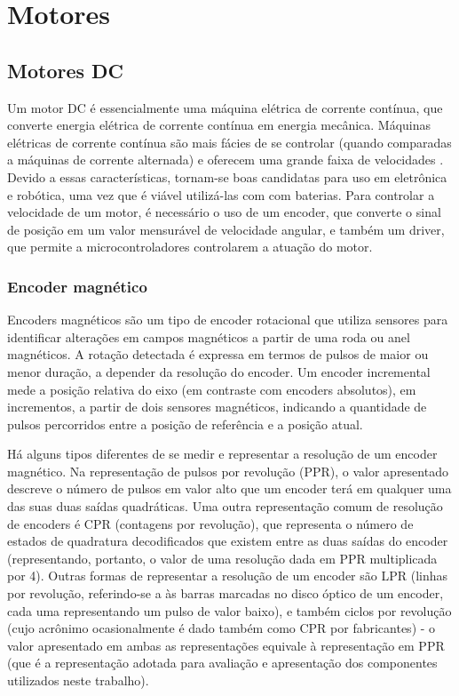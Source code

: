 
\section{Motores}  \label{secao_motores}

\subsection{Motores DC}


Um motor DC é essencialmente uma máquina elétrica de corrente contínua, que
converte energia elétrica de corrente contínua em energia mecânica. Máquinas
elétricas de corrente contínua são mais fácies de se controlar (quando
comparadas a máquinas de corrente alternada) e oferecem uma grande faixa de
velocidades \cite{Maquinas_eletricas}. Devido a essas características, tornam-se
boas candidatas para uso em eletrônica e robótica, uma vez que é viável
utilizá-las com com baterias. Para controlar a velocidade de um motor, é
necessário o uso de um encoder, que converte o sinal de posição em um valor
mensurável de velocidade angular, e também um driver, que permite a
microcontroladores controlarem a atuação do motor.

\subsubsection{Encoder magnético}

	Encoders magnéticos são um tipo de encoder rotacional que utiliza sensores 
	para identificar alterações em campos magnéticos a partir de uma roda ou 
	anel magnéticos. A rotação detectada é expressa em termos de pulsos de maior
	ou menor duração, a depender da resolução do encoder. Um encoder incremental
	mede a posição relativa do eixo (em contraste com encoders absolutos), em
	incrementos, a partir de dois sensores magnéticos, indicando a quantidade de
	pulsos percorridos entre a posição de referência e a posição atual.
	
	Há alguns tipos diferentes de se medir e representar a resolução de um
	encoder magnético. Na representação de pulsos por revolução (PPR), o valor 
	apresentado descreve o número de pulsos em valor alto que um encoder terá em
	qualquer uma das suas duas saídas quadráticas. Uma outra representação comum
	de resolução de encoders é CPR (contagens por revolução), que representa o
	número de estados de quadratura decodificados que existem entre as duas
	saídas do encoder (representando, portanto, o valor de uma resolução dada em
	PPR multiplicada por 4). Outras formas de representar a resolução de um
	encoder são LPR (linhas por revolução, referindo-se a às barras marcadas no
	disco óptico de um encoder, cada uma representando um pulso de valor baixo),
	e também ciclos por revolução (cujo acrônimo ocasionalmente é dado também
	como CPR por fabricantes) - o valor apresentado em ambas as representações 
	equivale à representação em PPR (que é a representação adotada para
	avaliação e apresentação dos componentes utilizados neste trabalho). 
	
